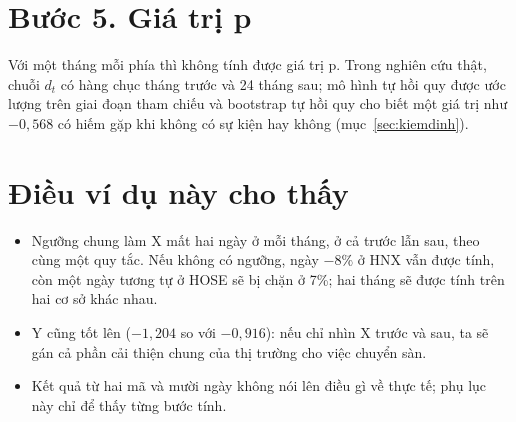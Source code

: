 \section*{Bước 5. Giá trị p}

Với một tháng mỗi phía thì không tính được giá trị p. Trong nghiên cứu thật, chuỗi $d_t$ có hàng chục tháng trước và 24 tháng sau; mô hình tự hồi quy được ước lượng trên giai đoạn tham chiếu và bootstrap tự hồi quy cho biết một giá trị như $-0{,}568$ có hiếm gặp khi không có sự kiện hay không (mục~\ref{sec:kiemdinh}).

\section*{Điều ví dụ này cho thấy}

\begin{itemize}
\item Ngưỡng chung làm X mất hai ngày ở mỗi tháng, ở cả trước lẫn sau, theo cùng một quy tắc. Nếu không có ngưỡng, ngày $-8\%$ ở HNX vẫn được tính, còn một ngày tương tự ở HOSE sẽ bị chặn ở 7\%; hai tháng sẽ được tính trên hai cơ sở khác nhau.
\item Y cũng tốt lên ($-1{,}204$ so với $-0{,}916$): nếu chỉ nhìn X trước và sau, ta sẽ gán cả phần cải thiện chung của thị trường cho việc chuyển sàn.
\item Kết quả từ hai mã và mười ngày không nói lên điều gì về thực tế; phụ lục này chỉ để thấy từng bước tính.
\end{itemize}
